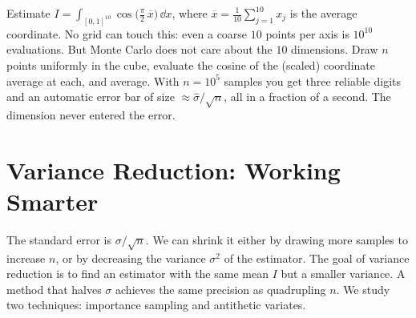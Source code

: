 \begin{example}
\label{ch35:ex-highdim}
Estimate $I = \int_{[0,1]^{10}} \cos\!\bigl(\tfrac{\pi}{2}\,\overline{x}\bigr)\,\dd x$,
where $\overline{x} = \frac{1}{10}\sum_{j=1}^{10} x_j$ is the average coordinate.
No grid can touch this: even a coarse $10$ points per axis is
$10^{10}$ evaluations. But Monte Carlo does not care about the $10$ dimensions.
Draw $n$ points uniformly in the cube, evaluate the cosine of the (scaled)
coordinate average at each, and average. With $n = 10^5$ samples you get three
reliable digits and an automatic error bar of size $\approx \hat\sigma/\sqrt{n}$,
all in a fraction of a second. The dimension never entered the error.
\end{example}
\section{Variance Reduction: Working Smarter}
\label{ch35:variance-reduction}
The standard error is $\sigma/\sqrt n$. We can shrink it either by drawing
more samples to increase $n$, or by decreasing the variance $\sigma^2$ of the estimator.
The goal of variance reduction is to find an estimator with the same mean $I$ but a
smaller variance. A method that halves $\sigma$ achieves the same precision as quadrupling $n$.
We study two techniques: importance sampling and antithetic variates.
